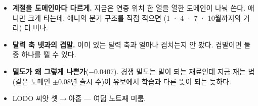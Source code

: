 \documentclass[11pt]{article}
\begin{document}
\begin{itemize}
\item \textbf{계절을 도메인마다 다르게.} 지금은 연중 위치 한 열을 열한
도메인이 나눠 쓴다. 애니만 크게 타는데, 애니의 분기 구조를 직접 적으면
(1 · 4 · 7 · 10월까지의 거리) 더 버나.
\item \textbf{달력 축 넷과의 겹말.} 이미 있는 달력 축과 얼마나 겹치는지
안 봤다. 겹말이면 둘 중 하나를 뗄 수 있다.
\item \textbf{밀도가 왜 그렇게 나쁜가}($-0.0407$). 경쟁 밀도는 말이 되는
재료인데 지금 재는 법(같은 도메인 $\pm 0.08$년 출시 수)이 유보에서
학습과 다른 뜻이 되는 듯하다.
\item LODO 씨앗 셋$\to$아홉 --- 여덟 노트째 미룸.
\end{itemize}
\end{document}
